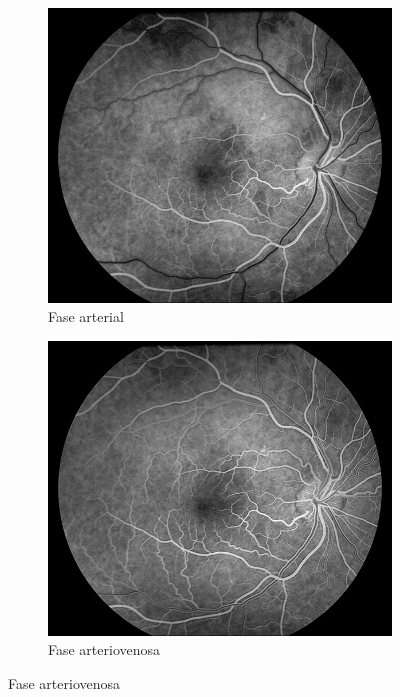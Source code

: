 \begin{figure}[H]
  \centering
	\begin{subfigure}[b]{0.45\textwidth}
        \includegraphics[width=1\textwidth]{./Figures/FA_Fig1.jpg}
        \caption{Fase arterial}
        \label{fig:af1}
    \end{subfigure}
	\begin{subfigure}[b]{0.45\textwidth}
        \includegraphics[width=1\textwidth]{./Figures/FA_Fig2.jpg}
        \caption{Fase arteriovenosa}

\end{subfigure}
\end{figure}
